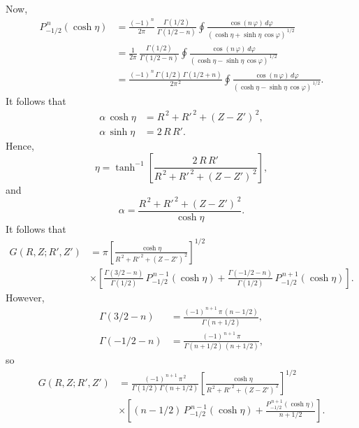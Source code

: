 \documentclass[12pt]{article}
\begin{document}
Now, 
\begin{align}
P^{\,n}_{-1/2}(\cosh\eta) &= \frac{(-1)^{\,n}}{2\pi}\,\frac{\Gamma(1/2)}{\Gamma(1/2-n)}\oint \frac{\cos(n\,\varphi)\,d\varphi}{(\cosh\eta+\sinh\eta\,\cos\varphi)^{\,1/2}}\nonumber\\[0.5ex]
 &=\frac{1}{2\pi}\,\frac{\Gamma(1/2)}{\Gamma(1/2-n)}\oint \frac{\cos(n\,\varphi)\,d\varphi}{(\cosh\eta-\sinh\eta\,\cos\varphi)^{\,1/2}}\nonumber\\[0.5ex]
 &=\frac{(-1)^{\,n}\,\Gamma(1/2)\,\Gamma(1/2+n)}{2\pi^{\,2}}\oint
 \frac{\cos(n\,\varphi)\,d\varphi}{(\cosh\eta-\sinh\eta\,\cos\varphi)^{\,1/2}}.
\end{align}
It follows that
\begin{align}
\alpha\,\cosh\eta &= R^{\,2} +R'^{\,2} + (Z-Z')^{\,2},\\[0.5ex]
\alpha\,\sinh\eta &= 2\,R\,R'.
\end{align}
Hence,
\begin{equation}
\eta = \tanh^{-1}\left[\frac{2\,R\,R'}{R^{\,2}+R'^{\,2}+(Z-Z')^{\,2}}\right],
\end{equation}
and
\begin{equation}
\alpha = \frac{R^{\,2} +R'^{\,2} + (Z-Z')^{\,2}}{\cosh\eta}.
\end{equation}
It follows that
\begin{align}
G(R,Z;R',Z')&=\pi\left[\frac{\cosh\eta}{R^{\,2}+R'^{\,2}+(Z-Z')^{\,2}}\right]^{1/2}\nonumber\\[0.5ex]
&
\times\left[\frac{\Gamma(3/2-n)}{\Gamma(1/2)}\,P_{-1/2}^{\,n-1}(\cosh\eta)
+ \frac{\Gamma(-1/2-n)}{\Gamma(1/2)}\,P_{-1/2}^{\,n+1}(\cosh\eta)\right].
\end{align}
However,
\begin{align}
{\Gamma}(3/2-n)  &=\frac{(-1)^{\,n+1}\,\pi\,(n-1/2)}{\Gamma(n+1/2)},\\[0.5ex]
{\Gamma}(-1/2-n)&= \frac{(-1)^{\,n+1}\,\pi}{\Gamma(n+1/2)\,(n+1/2)},
\end{align}
so
\begin{align}
G(R,Z;R',Z')&= \frac{(-1)^{\,n+1}\,\pi^{\,2}}{\Gamma(1/2)\,\Gamma(n+1/2)}
\left[\frac{\cosh\eta}{R^{\,2}+R'^{\,2}+(Z-Z')^{\,2}}\right]^{1/2}\nonumber\\[0.5ex]
&\times\left[(n-1/2)\,P_{-1/2}^{\,n-1}(\cosh\eta)+
\frac{P_{-1/2}^{\,n+1}(\cosh\eta)}{n+1/2}\right].
\end{align}
\end{document}
